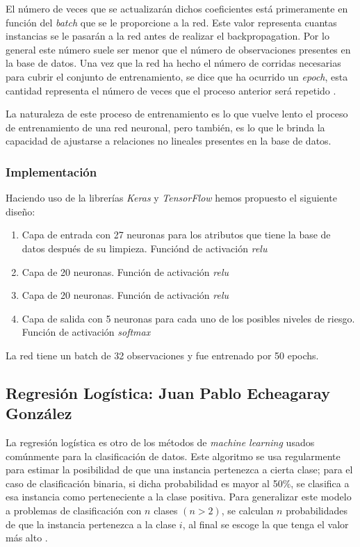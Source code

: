 \documentclass[journal]{IEEEtran}                                                          %
\begin{document}
            El número de veces que se actualizarán dichos coeficientes está primeramente en función del \emph{batch} que se le proporcione a la red. Este valor representa cuantas instancias se le pasarán a la red antes de realizar el backpropagation. Por lo general este número suele ser menor que el número de observaciones presentes en la base de datos. Una vez que la red ha hecho el número de corridas necesarias para cubrir el conjunto de entrenamiento, se dice que ha ocurrido un \emph{epoch}, esta cantidad representa el número de veces que el proceso anterior será repetido \cite{geron-2019} \cite{team-2022}.

            La naturaleza de este proceso de entrenamiento es lo que vuelve lento el proceso de entrenamiento de una red neuronal, pero también, es lo que le brinda la capacidad de ajustarse a relaciones no lineales presentes en la base de datos.

            \subsubsection{Implementación}

                Haciendo uso de la librerías \emph{Keras} y \emph{TensorFlow} hemos propuesto el siguiente diseño:
                \begin{enumerate}
                    \item Capa de entrada con 27 neuronas para los atributos que tiene la base de datos después de su limpieza. Funciónd de activación \emph{relu}
                    \item Capa de 20 neuronas. Función de activación \emph{relu}
                    \item Capa de 20 neuronas. Función de activación \emph{relu}
                    \item Capa de salida con 5 neuronas para cada uno de los posibles niveles de riesgo. Función de activación \emph{softmax}
                \end{enumerate}

                La red tiene un batch de 32 observaciones y fue entrenado por 50 epochs.

        \subsection{Regresión Logística: Juan Pablo Echeagaray González} \label{logistic}

            La regresión logística es otro de los métodos de \emph{machine learning} usados comúnmente para la clasificación de datos. Este algoritmo se usa regularmente para estimar la posibilidad de que una instancia pertenezca a cierta clase; para el caso de clasificación binaria, si dicha probabilidad es mayor al 50\%, se clasifica a esa instancia como perteneciente a la clase positiva. Para generalizar este modelo a problemas de clasificación con $n$ clases $(n > 2)$, se calculan $n$ probabilidades de que la instancia pertenezca a la clase $i$, al final se escoge la que tenga el valor más alto \cite{geron-2019} \cite{sci-kit-learn-no-dateB}.
\end{document}
